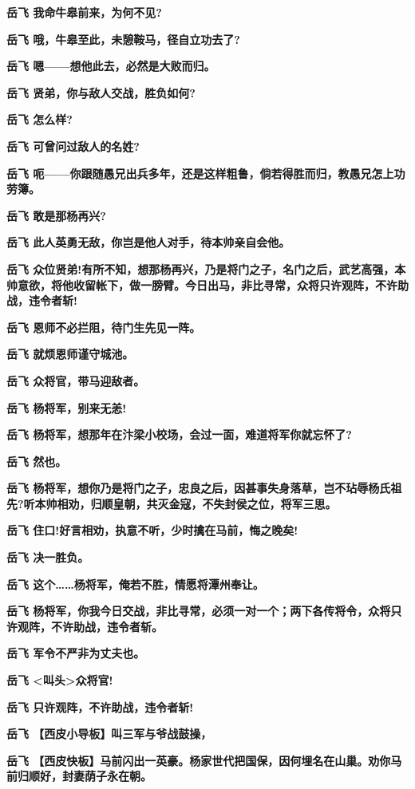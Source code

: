 \textbf{岳飞 我命牛皋前来，为何不见?}

\textbf{岳飞 哦，牛皋至此，未憩鞍马，径自立功去了?}

\textbf{岳飞 嗯------想他此去，必然是大败而归。}

\textbf{岳飞 贤弟，你与敌人交战，胜负如何?}

\textbf{岳飞 怎么样?}

\textbf{岳飞 可曾问过敌人的名姓?}

\textbf{岳飞
呃------你跟随愚兄出兵多年，还是这样粗鲁，倘若得胜而归，教愚兄怎上功劳簿。}

\textbf{岳飞 敢是那杨再兴?}

\textbf{岳飞 此人英勇无敌，你岂是他人对手，待本帅亲自会他。}

\textbf{岳飞
众位贤弟!有所不知，想那杨再兴，乃是将门之子，名门之后，武艺高强，本帅意欲，将他收留帐下，做一膀臂。今日出马，非比寻常，众将只许观阵，不许助战，违令者斩!}

\textbf{岳飞 恩师不必拦阻，待门生先见一阵。}

\textbf{岳飞 就烦恩师谨守城池。}

\textbf{岳飞 众将官，带马迎敌者。}

\textbf{岳飞 杨将军，别来无恙!}

\textbf{岳飞 杨将军，想那年在汴梁小校场，会过一面，难道将军你就忘怀了?}

\textbf{岳飞 然也。}

\textbf{岳飞
杨将军，想你乃是将门之子，忠良之后，因甚事失身落草，岂不玷辱杨氏祖先?听本帅相劝，归顺皇朝，共灭金寇，不失封侯之位，将军三思。}

\textbf{岳飞 住口!好言相劝，执意不听，少时擒在马前，悔之晚矣!}

\textbf{岳飞 决一胜负。}

\textbf{岳飞 这个\ldots{}\ldots{}杨将军，俺若不胜，情愿将潭州奉让。}

\textbf{岳飞
杨将军，你我今日交战，非比寻常，必须一对一个；两下各传将令，众将只许观阵，不许助战，违令者斩。}

\textbf{岳飞 军令不严非为丈夫也。}

\textbf{岳飞 \textless{}叫头\textgreater{}众将官!}

\textbf{岳飞 只许观阵，不许助战，违令者斩!}

\textbf{岳飞 【西皮小导板】叫三军与爷战鼓操，}

\textbf{岳飞
【西皮快板】马前闪出一英豪。杨家世代把国保，因何埋名在山巢。劝你马前归顺好，封妻荫子永在朝。}

